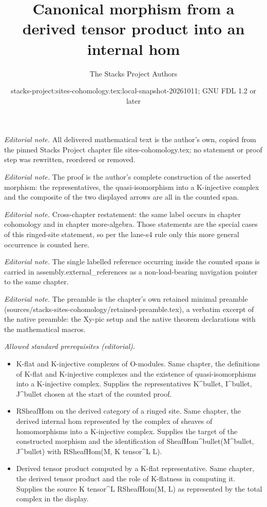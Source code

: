 \documentclass[10pt,a4paper]{amsart}
\title{Canonical morphism from a derived tensor product into an internal hom}
\author{The Stacks Project Authors}
\date{stacks-project:sites-cohomology.tex:local-snapshot-20261011; GNU FDL 1.2 or later}
\theoremstyle{plain}
\theoremstyle{definition}
\theoremstyle{remark}
\numberwithin{equation}{subsection}
\begin{document}
\maketitle
\noindent\textit{Editorial note.} All delivered mathematical text is the author's own, copied from the pinned Stacks Project chapter file sites-cohomology.tex; no statement or proof step was rewritten, reordered or removed.\par\medskip
\noindent\textit{Editorial note.} The proof is the author's complete construction of the asserted morphism: the representatives, the quasi-isomorphism into a K-injective complex and the composite of the two displayed arrows are all in the counted span.\par\medskip
\noindent\textit{Editorial note.} Cross-chapter restatement: the same label occurs in chapter cohomology and in chapter more-algebra. Those statements are the special cases of this ringed-site statement, so per the lane-s4 rule only this more general occurrence is counted here.\par\medskip
\noindent\textit{Editorial note.} The single labelled reference occurring inside the counted spans is carried in assembly.external\_references as a non-load-bearing navigation pointer to the same chapter.\par\medskip
\noindent\textit{Editorial note.} The preamble is the chapter's own retained minimal preamble (sources/stacks-sites-cohomology/retained-preamble.tex), a verbatim excerpt of the native preamble: the Xy-pic setup and the native theorem declarations with the mathematical macros.\par\medskip
\noindent\textit{Allowed standard prerequisites (editorial).}\begin{itemize}
\item K-flat and K-injective complexes of O-modules. Same chapter, the definitions of K-flat and K-injective complexes and the existence of quasi-isomorphisms into a K-injective complex. Supplies the representatives K\textasciicircum{}bullet, I\textasciicircum{}bullet, J\textasciicircum{}bullet chosen at the start of the counted proof.
\item RSheafHom on the derived category of a ringed site. Same chapter, the derived internal hom represented by the complex of sheaves of homomorphisms into a K-injective complex. Supplies the target of the constructed morphism and the identification of SheafHom\textasciicircum{}bullet(M\textasciicircum{}bullet, J\textasciicircum{}bullet) with RSheafHom(M, K tensor\textasciicircum{}L L).
\item Derived tensor product computed by a K-flat representative. Same chapter, the derived tensor product and the role of K-flatness in computing it. Supplies the source K tensor\textasciicircum{}L RSheafHom(M, L) as represented by the total complex in the display.
\end{itemize}\medskip
\end{document}
